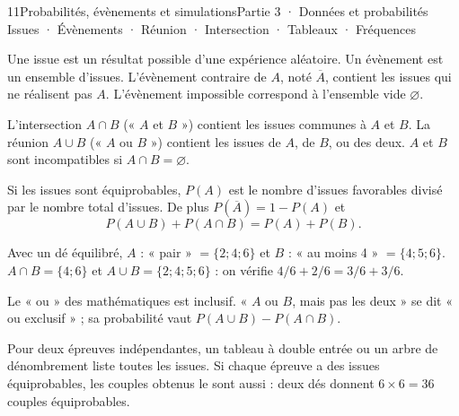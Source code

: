 \begin{ouverture}[probabilites]{11}{Probabilités, évènements et simulations}{Partie 3 · Données et probabilités}
{Issues · Évènements · Réunion · Intersection · Tableaux · Fréquences}
\end{ouverture}
\pagestyle{otMain}\essentiel\fontsize{11}{15}\selectfont
{}
\begin{definition}Une issue est un résultat possible d’une expérience aléatoire. Un évènement est un ensemble d’issues. L’évènement contraire de $A$, noté $\overline A$, contient les issues qui ne réalisent pas $A$. L’évènement impossible correspond à l’ensemble vide $\varnothing$.\end{definition}
\begin{definition}L’intersection $A\cap B$ (« $A$ et $B$ ») contient les issues communes à $A$ et $B$. La réunion $A\cup B$ (« $A$ ou $B$ ») contient les issues de $A$, de $B$, ou des deux. $A$ et $B$ sont incompatibles si $A\cap B=\varnothing$.\end{definition}
\begin{propriete}Si les issues sont équiprobables, $P(A)$ est le nombre d’issues favorables divisé par le nombre total d’issues. De plus $P(\overline A)=1-P(A)$ et
\[P(A\cup B)+P(A\cap B)=P(A)+P(B).\]\end{propriete}
\begin{exemple}Avec un dé équilibré, $A$ : « pair » $=\{2;4;6\}$ et $B$ : « au moins 4 » $=\{4;5;6\}$. $A\cap B=\{4;6\}$ et $A\cup B=\{2;4;5;6\}$ : on vérifie $4/6+2/6=3/6+3/6$.\end{exemple}
\begin{attention}Le « ou » des mathématiques est inclusif. « $A$ ou $B$, mais pas les deux » se dit « ou exclusif » ; sa probabilité vaut $P(A\cup B)-P(A\cap B)$.\end{attention}
\clearpage
{}
\begin{savoirfaire}[Dénombrer]Pour deux épreuves indépendantes, un tableau à double entrée ou un arbre de dénombrement liste toutes les issues. Si chaque épreuve a des issues équiprobables, les couples obtenus le sont aussi : deux dés donnent $6\times6=36$ couples équiprobables.\end{savoirfaire}

